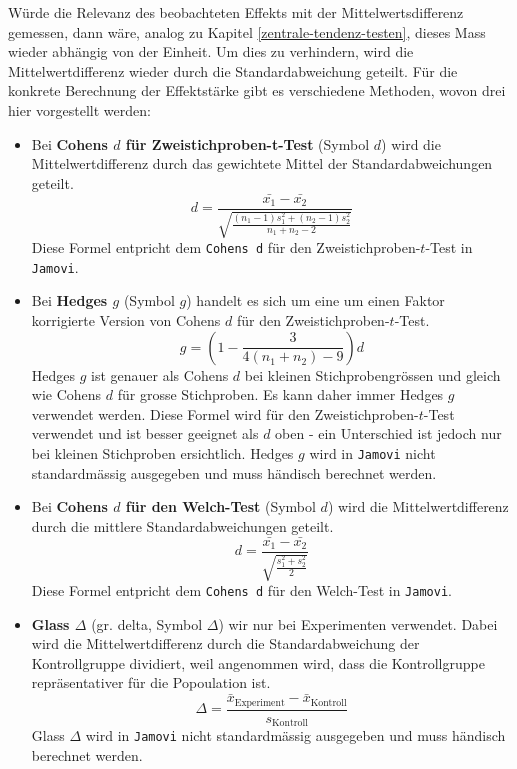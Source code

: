 \documentclass[
]{book}
\providecommand{\tightlist}{%
  \setlength{\itemsep}{0pt}\setlength{\parskip}{0pt}}
\theoremstyle{definition}
\theoremstyle{definition}
\theoremstyle{definition}
\theoremstyle{definition}
\theoremstyle{remark}
\begin{document}
Würde die Relevanz des beobachteten Effekts mit der Mittelwertsdifferenz gemessen, dann wäre, analog zu Kapitel \ref{zentrale-tendenz-testen}, dieses Mass wieder abhängig von der Einheit. Um dies zu verhindern, wird die Mittelwertdifferenz wieder durch die Standardabweichung geteilt. Für die konkrete Berechnung der Effektstärke gibt es verschiedene Methoden, wovon drei hier vorgestellt werden:

\begin{itemize}
\tightlist
\item
  \label{customdef-cohens-d}{Bei \textbf{Cohens \(d\) für Zweistichproben-t-Test} (Symbol \(d\)) wird die Mittelwertdifferenz durch das gewichtete Mittel der Standardabweichungen geteilt.}
  \[d = \frac{\bar{x_1}-\bar{x_2}}{\sqrt{\frac{(n_1 - 1) s_1^2+(n_2-1)s_2^2}{n_1 + n_2 - 2}}}\]
  Diese Formel entpricht dem \texttt{Cohens\ d} für den Zweistichproben-\(t\)-Test in \texttt{Jamovi}.
\item
  \label{customdef-hedges-g}{Bei \textbf{Hedges \(g\)} (Symbol \(g\)) handelt es sich um eine um einen Faktor korrigierte Version von Cohens \(d\) für den Zweistichproben-\(t\)-Test.}
  \[g = \left(1-\frac{3}{4(n_1+n_2)-9}\right)d\]
  Hedges \(g\) ist genauer als Cohens \(d\) bei kleinen Stichprobengrössen und gleich wie Cohens \(d\) für grosse Stichproben. Es kann daher immer Hedges \(g\) verwendet werden. Diese Formel wird für den Zweistichproben-\(t\)-Test verwendet und ist besser geeignet als \(d\) oben - ein Unterschied ist jedoch nur bei kleinen Stichproben ersichtlich. Hedges \(g\) wird in \texttt{Jamovi} nicht standardmässig ausgegeben und muss händisch berechnet werden.
\item
  \label{customdef-welch-cohens-d}{Bei \textbf{Cohens \(d\) für den Welch-Test} (Symbol \(d\)) wird die Mittelwertdifferenz durch die mittlere Standardabweichungen geteilt.}
  \[d = \frac{\bar{x_1}-\bar{x_2}}{\sqrt{\frac{s_1^2+s_2^2}{2}}}\]
  Diese Formel entpricht dem \texttt{Cohens\ d} für den Welch-Test in \texttt{Jamovi}.
\item
  \label{customdef-glass-delta}{\textbf{Glass \(\Delta\)} (gr. delta, Symbol \(\Delta\)) wir nur bei Experimenten verwendet. Dabei wird die Mittelwertdifferenz durch die Standardabweichung der Kontrollgruppe dividiert, weil angenommen wird, dass die Kontrollgruppe repräsentativer für die Popoulation ist.}
  \[\Delta = \frac{\bar{x}_\text{Experiment}-\bar{x}_\text{Kontroll}}{s_\text{Kontroll}}\]
  Glass \(\Delta\) wird in \texttt{Jamovi} nicht standardmässig ausgegeben und muss händisch berechnet werden.
\end{itemize}
\end{document}
